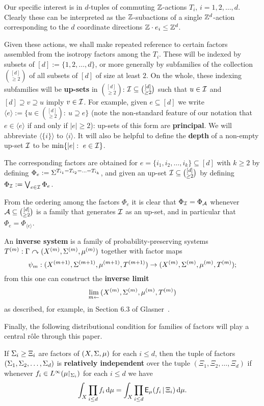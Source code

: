 \documentclass[12pt]{article}
\begin{document}
Our specific interest is in $d$-tuples of commuting $\bbZ$-actions
$T_i$, $i=1,2,\ldots,d$.  Clearly these can be interpreted as the
$\bbZ$-subactions of a single $\bbZ^d$-action corresponding to the
$d$ coordinate directions $\bbZ\cdot e_i \leq \bbZ^d$.

Given these actions, we shall make repeated reference to certain
factors assembled from the isotropy factors among the $T_i$. These
will be indexed by subsets of $[d] := \{1,2,\ldots,d\}$, or more
generally by subfamilies of the collection $\binom{[d]}{\geq 2}$ of
all subsets of $[d]$ of size at least $2$.  On the whole, these
indexing subfamilies will be \textbf{up-sets} in $\binom{[d]}{\geq
2}$: $\I\subseteq \binom{[d]}{\geq 2}$ such that $u \in \I$ and
$[d]\supseteq v\supseteq u$ imply $v \in \I$. For example, given $e
\subseteq [d]$ we write $\langle e\rangle := \{u \in\binom{[d]}{\geq
2}:\ u\supseteq e\}$ (note the non-standard feature of our notation
that $e \in \langle e\rangle$ if and only if $|e| \geq 2$): up-sets
of this form are \textbf{principal}.  We will abbreviate
$\langle\{i\}\rangle$ to $\langle i\rangle$. It will also be helpful
to define the \textbf{depth} of a non-empty up-set $\I$ to be
$\min\{|e|:\ e\in \I\}$.

The corresponding factors are obtained for $e =
\{i_1,i_2,\ldots,i_k\}\subseteq [d]$ with $k\geq 2$ by defining
$\Phi_e := \S^{T_{i_1} = T_{i_2} = \ldots = T_{i_k}}$, and given an
up-set $\cal{I} \subseteq \binom{[d]}{\geq 2}$ by defining
$\Phi_{\cal{I}} := \bigvee_{e\in\cal{I}}\Phi_e$.

From the ordering among the factors $\Phi_e$ it is clear that
$\Phi_{\cal{I}} = \Phi_{\cal{A}}$ whenever $\cal{A} \subseteq
\binom{[d]}{\geq 2}$ is a family that generates $\cal{I}$ as an
up-set, and in particular that $\Phi_e = \Phi_{\langle e\rangle}$.

An \textbf{inverse system} is a family of probability-preserving
systems $T^{(m)}:\G\curvearrowright(X^{(m)},\S^{(m)},\mu^{(m)})$
together with factor maps
\[\psi_m:(X^{(m+1)},\S^{(m+1)},\mu^{(m+1)},T^{(m+1)})\to
(X^{(m)},\S^{(m)},\mu^{(m)},T^{(m)});\] from this one can construct
the \textbf{inverse limit}
\[\lim_{m\leftarrow}\,(X^{(m)},\S^{(m)},\mu^{(m)},T^{(m)})\] as
described, for example, in Section 6.3 of Glasner~\cite{Gla03}.

Finally, the following distributional condition for families of
factors will play a central r\^ole through this paper.

\begin{dfn}
If $\S_i \geq \Xi_i$ are factors of $(X,\S,\mu)$ for each $i\leq d$,
then the tuple of factors $(\S_1,\S_2,\ldots,\S_d)$ is
\textbf{relatively independent} over the tuple
$(\Xi_1,\Xi_2,\ldots,\Xi_d)$ if whenever $f_i\in
L^\infty(\mu\uhr_{\S_i})$ for each $i\leq d$ we have
\[\int_X\prod_{i\leq d}f_i\,\d\mu = \int_X\prod_{i\leq d}\sfE_\mu(f_i\,|\,\Xi_i)\,\d\mu.\]
\end{dfn}
\end{document}
